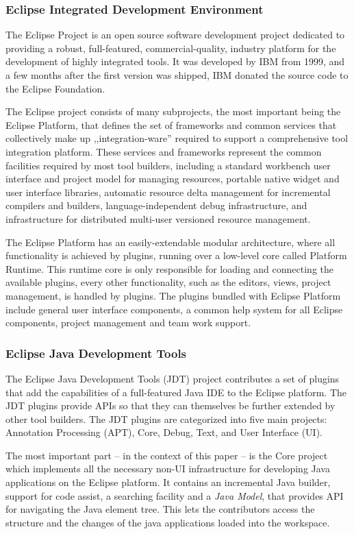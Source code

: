\subsubsection{Eclipse Integrated Development Environment}
The Eclipse Project \cite{Eclipseproject} is an open source software development
project dedicated to providing a robust, full-featured, commercial-quality,
industry platform for the development of highly integrated tools. It was
developed by IBM from 1999, and a few months after the first version was
shipped, IBM donated the source code to the Eclipse Foundation.

The Eclipse project consists of many subprojects, the most important being the
Eclipse Platform, that defines the set of frameworks and common services that
collectively make up ,,integ\-ration-ware'' required to support a comprehensive
tool integration platform. These services and frameworks represent the common
facilities required by most tool builders, including a standard workbench user
interface and project model for managing resources, portable native widget and
user interface libraries, automatic resource delta management for incremental
compilers and builders, language-independent debug infrastructure, and
infrastructure for distributed multi-user versioned resource management.

The Eclipse Platform has an easily-extendable modular architecture, where all
functionality is achieved by plugins, running over a low-level core called
Platform Runtime. This runtime core is only responsible for loading and
connecting the available plugins, every other functionality, such as the
editors, views, project management, is handled by plugins. The plugins bundled
with Eclipse Platform include general user interface components, a common help
system for all Eclipse components, project management and team work support.

\subsubsection{Eclipse Java Development Tools}
The Eclipse Java Development Tools (JDT) project \cite{JDT} contributes a set of
plugins that add the capabilities of a full-featured Java IDE to the Eclipse
platform. The JDT plugins provide APIs so that they can themselves be further
extended by other tool builders. The JDT plugins are categorized into five main
projects: Annotation Processing (APT), Core, Debug, Text, and User Interface
(UI).

The most important part -- in the context of this paper -- is the Core project
which implements all the necessary non-UI infrastructure for developing Java
applications on the Eclipse platform. It contains an incremental Java builder,
support for code assist, a searching facility and a \emph{Java Model}, that
provides API for navigating the Java element tree. This lets the contributors
access the structure and the changes of the java applications loaded into the
workspace.

